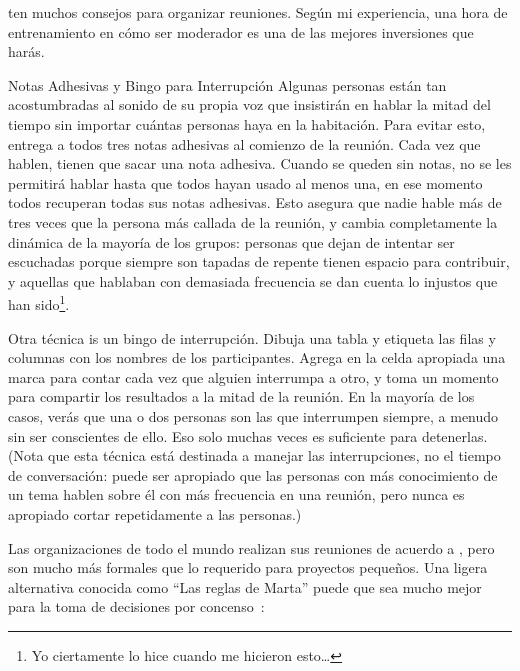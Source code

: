\cite{Brow2007,Broo2016,Roge2018} ten muchos consejos para organizar reuniones.
Según mi experiencia,
una hora de entrenamiento en cómo ser moderador
es una de las mejores inversiones que harás.

\begin{aside}{Notas Adhesivas y Bingo para Interrupción}
  Algunas personas están tan acostumbradas al sonido de su propia voz
  que insistirán en hablar la mitad del tiempo
  sin importar cuántas personas haya en la habitación.
  Para evitar esto,
  entrega a todos tres notas adhesivas al comienzo de la reunión.
  Cada vez que hablen,
  tienen que sacar una nota adhesiva.
  Cuando se queden sin notas,
  no se les permitirá hablar hasta que todos hayan usado al menos una,
  en ese momento todos recuperan todas sus notas adhesivas.
  Esto asegura que nadie hable más de tres veces que
  la persona más callada de la reunión,
  y cambia completamente la dinámica de la mayoría de los grupos:
  personas que dejan de intentar ser escuchadas porque siempre son tapadas
  de repente tienen espacio para contribuir,
  y aquellas que hablaban con demasiada frecuencia se dan cuenta lo injustos que han sido\footnote{
    Yo ciertamente lo hice cuando me hicieron esto{\ldots}
  }.

  Otra técnica is un bingo de interrupción.
  Dibuja una tabla y etiqueta las filas y columnas con los nombres de los participantes.
  Agrega en la celda apropiada una marca para contar 
  cada vez que alguien interrumpa a otro,
  y toma un momento para compartir los resultados a la mitad de la reunión.
  En la mayoría de los casos,
  verás que una o dos personas son las que interrumpen siempre,
  a menudo sin ser conscientes de ello.
  Eso solo muchas veces es suficiente  para detenerlas.
  (Nota que esta técnica está destinada a manejar las interrupciones,
  no el tiempo de conversación:
  puede ser apropiado que las personas con más conocimiento de un tema hablen sobre él con más frecuencia en una reunión,
  pero nunca es apropiado cortar repetidamente a las personas.)
\end{aside}


Las organizaciones de todo el mundo realizan sus reuniones de acuerdo a 
,
pero son mucho más formales que lo requerido para proyectos pequeños.
Una ligera alternativa conocida como ``Las reglas de Marta''
puede que sea mucho mejor para la toma de decisiones por concenso~\cite{Mina1986}:


